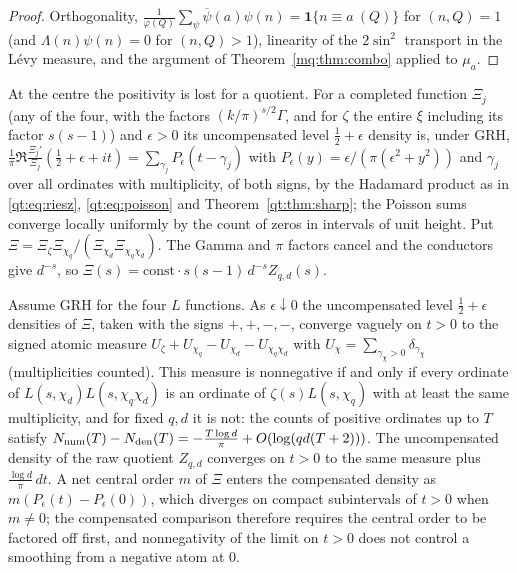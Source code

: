 \begin{proof}
Orthogonality, $\frac1{\varphi(Q)}\sum_\psi\overline\psi(a)\psi(n)=\mathbf 1\{n\equiv a\ (Q)\}$ for $(n,Q)=1$ (and $\Lambda(n)\psi(n)=0$ for $(n,Q)>1$), linearity of the $2\sin^2$ transport in the L\'evy measure, and the argument of Theorem~\ref{mq:thm:combo} applied to $\mu_a$.
\end{proof}

At the centre the positivity is lost for a quotient. For a completed function $\Xi_j$ (any of the four, with the factors $(k/\pi)^{s/2}\Gamma$, and for $\zeta$ the entire $\xi$ including its factor $s(s-1)$) and $\epsilon>0$ its uncompensated level $\frac12+\epsilon$ density is, under GRH, $\frac1\pi\Re\frac{\Xi_j'}{\Xi_j}(\frac12+\epsilon+it)=\sum_{\gamma_j}P_\epsilon(t-\gamma_j)$ with $P_\epsilon(y)=\epsilon/(\pi(\epsilon^2+y^2))$ and $\gamma_j$ over all ordinates with multiplicity, of both signs, by the Hadamard product as in \eqref{qt:eq:riesz}, \eqref{qt:eq:poisson} and Theorem~\ref{qt:thm:sharp}; the Poisson sums converge locally uniformly by the count of zeros in intervals of unit height. Put $\Xi=\Xi_\zeta\Xi_{\chi_q}/(\Xi_{\chi_d}\Xi_{\chi_q\chi_d})$. The Gamma and $\pi$ factors cancel and the conductors give $d^{-s}$, so $\Xi(s)=\mathrm{const}\cdot s(s-1)\,d^{-s}Z_{q,d}(s)$.

\begin{proposition}\label{mq:prop:obstruction}
Assume GRH for the four $L$ functions. As $\epsilon\downarrow0$ the uncompensated level $\frac12+\epsilon$ densities of $\Xi$, taken with the signs $+,+,-,-$, converge vaguely on $t>0$ to the signed atomic measure $U_\zeta+U_{\chi_q}-U_{\chi_d}-U_{\chi_q\chi_d}$ with $U_\chi=\sum_{\gamma_\chi>0}\delta_{\gamma_\chi}$ (multiplicities counted). This measure is nonnegative if and only if every ordinate of $L(s,\chi_d)L(s,\chi_q\chi_d)$ is an ordinate of $\zeta(s)L(s,\chi_q)$ with at least the same multiplicity, and for fixed $q,d$ it is not: the counts of positive ordinates up to $T$ satisfy $N_{\rm num}(T)-N_{\rm den}(T)=-\frac{T\log d}\pi+O(\log(qd(T+2)))$. The uncompensated density of the raw quotient $Z_{q,d}$ converges on $t>0$ to the same measure plus $\frac{\log d}\pi\,dt$. A net central order $m$ of $\Xi$ enters the compensated density as $m(P_\epsilon(t)-P_\epsilon(0))$, which diverges on compact subintervals of $t>0$ when $m\ne0$; the compensated comparison therefore requires the central order to be factored off first, and nonnegativity of the limit on $t>0$ does not control a smoothing from a negative atom at $0$.
\end{proposition}

